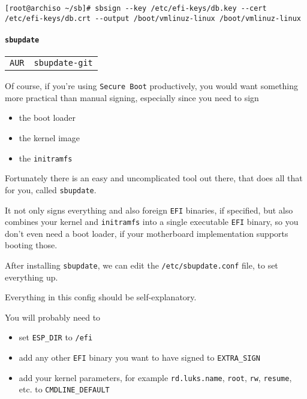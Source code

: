 \documentclass[9pt]{report}
\newenvironment{packagetable}
{\begin{longtabu}to \textwidth [b]{X[1,r]|X[1,l]}}
{\end{longtabu}}
\begin{document}
\begin{verbatim}
[root@archiso ~/sb]# sbsign --key /etc/efi-keys/db.key --cert /etc/efi-keys/db.crt --output /boot/vmlinuz-linux /boot/vmlinuz-linux
\end{verbatim}


\newpage

\hypertarget{x-sbupdate}{\paragraph{\texttt{sbupdate}}}
\begin{packagetable}
    \texttt{AUR} & \texttt{sbupdate-git} \\ 
\end{packagetable}

Of course, if you’re using \texttt{Secure Boot} productively, you would want something more practical than manual signing, especially since you need to sign


\begin{itemize}

    \item the boot loader

    \item the kernel image

    \item the \texttt{initramfs}

\end{itemize}


Fortunately there is an easy and uncomplicated tool out there, that does all that for you, called \texttt{sbupdate}.


It not only signs everything and also foreign \texttt{EFI} binaries, if specified, but also combines your kernel and \texttt{initramfs} into a single executable \texttt{EFI} binary, so you don’t even need a boot loader, if your motherboard implementation supports booting those.


After installing \texttt{sbupdate}, we can edit the \texttt{/etc/sbupdate.conf} file, to set everything up.


Everything in this config should be self-explanatory.


You will probably need to


\begin{itemize}

    \item set \texttt{ESP\_DIR} to \texttt{/efi}

    \item add any other \texttt{EFI} binary you want to have signed to \texttt{EXTRA\_SIGN}

    \item add your kernel parameters, for example \texttt{rd.luks.name}, \texttt{root}, \texttt{rw}, \texttt{resume}, etc. to \texttt{CMDLINE\_DEFAULT}

\end{itemize}
\end{document}
